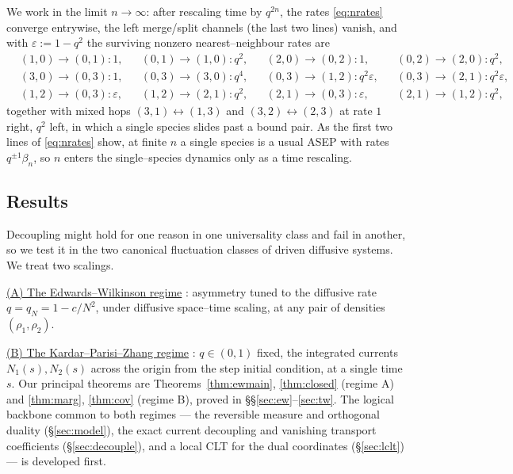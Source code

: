\documentclass[11pt]{article}
\theoremstyle{plain}
\theoremstyle{definition}
\theoremstyle{remark}
\newcommand{\eps}{\varepsilon}\newcommand{\Exp}{\mathrm{Exp}}
\begin{document}
We work in the limit $n\to\infty$: after rescaling time by $q^{2n}$, the rates
\eqref{eq:nrates} converge entrywise, the left merge/split channels (the last two
lines) vanish, and with $\eps:=1-q^2$ the surviving nonzero nearest--neighbour rates
are
\begin{equation}\label{eq:rates}
\begin{aligned}
&(1,0)\!\to\!(0,1):1, &&(0,1)\!\to\!(1,0):q^2, &&(2,0)\!\to\!(0,2):1, &&(0,2)\!\to\!(2,0):q^2,\\
&(3,0)\!\to\!(0,3):1, &&(0,3)\!\to\!(3,0):q^4, &&(0,3)\!\to\!(1,2):q^2\eps, &&(0,3)\!\to\!(2,1):q^2\eps,\\
&(1,2)\!\to\!(0,3):\eps, &&(1,2)\!\to\!(2,1):q^2, &&(2,1)\!\to\!(0,3):\eps, &&(2,1)\!\to\!(1,2):q^2,
\end{aligned}
\end{equation}
together with mixed hops $(3,1)\!\leftrightarrow\!(1,3)$ and
$(3,2)\!\leftrightarrow\!(2,3)$ at rate $1$ right, $q^2$ left, in which a single
species slides past a bound pair. As the first two lines of \eqref{eq:nrates} show,
at finite $n$ a single species is a usual ASEP with rates $q^{\pm1}\beta_n$, so $n$
enters the single--species dynamics only as a time rescaling.

\subsection{Results}\label{sec:introresults}
Decoupling might hold for one reason in one universality class and fail in another, so
we test it in the two canonical fluctuation classes of driven diffusive systems. We
treat two scalings. 

\underline{(A) The Edwards--Wilkinson regime} \cite{EW}: asymmetry tuned to
the diffusive rate $q=q_N=1-c/N^2$, under diffusive space--time scaling, at any pair of
densities $(\rho_1,\rho_2)$. 

\underline{(B) The Kardar--Parisi--Zhang
regime} \cite{KPZ}: $q\in(0,1)$ fixed, the integrated currents $N_1(s),N_2(s)$ across the origin
from the step initial condition, at a single time $s$. Our principal theorems are
Theorems~\ref{thm:ewmain}, \ref{thm:closed} (regime A) and \ref{thm:marg},
\ref{thm:cov} (regime B), proved in \S\S\ref{sec:ew}--\ref{sec:tw}. The logical
backbone common to both regimes --- the reversible measure and orthogonal duality
(\S\ref{sec:model}), the exact current decoupling and vanishing transport
coefficients (\S\ref{sec:decouple}), and a local CLT for the dual coordinates
(\S\ref{sec:lclt}) --- is developed first.
\end{document}

